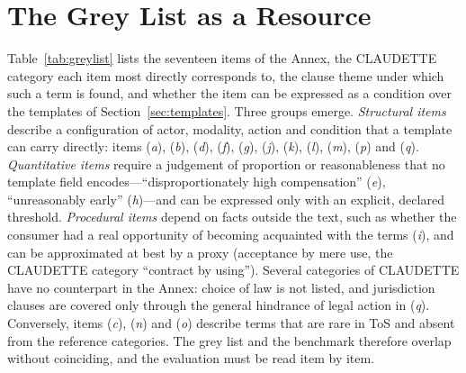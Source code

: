 \documentclass{IOS-Book-Article}
\newcommand{\corpus}{CLAUDETTE}
\newcommand{\gi}[1]{(\textit{#1})}
\begin{document}
\section{The Grey List as a Resource}
\label{sec:greylist}
Table~\ref{tab:greylist} lists the seventeen items of the Annex, the \corpus{} category each item most directly corresponds to, the clause theme under which such a term is found, and whether the item can be expressed as a condition over the templates of Section~\ref{sec:templates}. Three groups emerge. \emph{Structural items} describe a configuration of actor, modality, action and condition that a template can carry directly: items \gi{a}, \gi{b}, \gi{d}, \gi{f}, \gi{g}, \gi{j}, \gi{k}, \gi{l}, \gi{m}, \gi{p} and \gi{q}. \emph{Quantitative items} require a judgement of proportion or reasonableness that no template field encodes---``disproportionately high compensation'' \gi{e}, ``unreasonably early'' \gi{h}---and can be expressed only with an explicit, declared threshold. \emph{Procedural items} depend on facts outside the text, such as whether the consumer had a real opportunity of becoming acquainted with the terms \gi{i}, and can be approximated at best by a proxy (acceptance by mere use, the \corpus{} category ``contract by using''). Several categories of \corpus{} have no counterpart in the Annex: choice of law is not listed, and jurisdiction clauses are covered only through the general hindrance of legal action in \gi{q}. Conversely, items \gi{c}, \gi{n} and \gi{o} describe terms that are rare in ToS and absent from the reference categories. The grey list and the benchmark therefore overlap without coinciding, and the evaluation must be read item by item.
\end{document}
